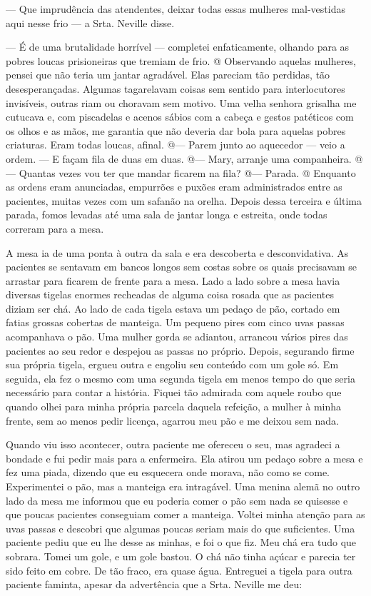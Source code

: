 --- Que imprudência das atendentes, deixar todas essas mulheres
mal-vestidas aqui nesse frio --- a Srta. Neville disse.

--- É de uma brutalidade horrível --- completei enfaticamente, olhando
para as pobres loucas prisioneiras que tremiam de frio. @ Observando
aquelas mulheres, pensei que não teria um jantar agradável. Elas
pareciam tão perdidas, tão desesperançadas. Algumas tagarelavam coisas
sem sentido para interlocutores invisíveis, outras riam ou choravam sem
motivo. Uma velha senhora grisalha me cutucava e, com piscadelas e
acenos sábios com a cabeça e gestos patéticos com os olhos e as mãos, me
garantia que não deveria dar bola para aquelas pobres criaturas. Eram
todas loucas, afinal. @--- Parem junto ao aquecedor --- veio a ordem.
--- E façam fila de duas em duas. @--- Mary, arranje uma companheira.
@--- Quantas vezes vou ter que mandar ficarem na fila? @--- Parada. @
Enquanto as ordens eram anunciadas, empurrões e puxões eram
administrados entre as pacientes, muitas vezes com um safanão na orelha.
Depois dessa terceira e última parada, fomos levadas até uma sala de
jantar longa e estreita, onde todas correram para a mesa.

A mesa ia de uma ponta à outra da sala e era descoberta e
desconvidativa. As pacientes se sentavam em bancos longos sem costas
sobre os quais precisavam se arrastar para ficarem de frente para a
mesa. Lado a lado sobre a mesa havia diversas tigelas enormes recheadas
de alguma coisa rosada que as pacientes diziam ser chá. Ao lado de cada
tigela estava um pedaço de pão, cortado em fatias grossas cobertas de
manteiga. Um pequeno pires com cinco uvas passas acompanhava o pão. Uma
mulher gorda se adiantou, arrancou vários pires das pacientes ao seu
redor e despejou as passas no próprio. Depois, segurando firme sua
própria tigela, ergueu outra e engoliu seu conteúdo com um gole só. Em
seguida, ela fez o mesmo com uma segunda tigela em menos tempo do que
seria necessário para contar a história. Fiquei tão admirada com aquele
roubo que quando olhei para minha própria parcela daquela refeição, a
mulher à minha frente, sem ao menos pedir licença, agarrou meu pão e me
deixou sem nada.

Quando viu isso acontecer, outra paciente me ofereceu o seu, mas
agradeci a bondade e fui pedir mais para a enfermeira. Ela atirou um
pedaço sobre a mesa e fez uma piada, dizendo que eu esquecera onde
morava, não como se come. Experimentei o pão, mas a manteiga era
intragável. Uma menina alemã no outro lado da mesa me informou que eu
poderia comer o pão sem nada se quisesse e que poucas pacientes
conseguiam comer a manteiga. Voltei minha atenção para as uvas passas e
descobri que algumas poucas seriam mais do que suficientes. Uma paciente
pediu que eu lhe desse as minhas, e foi o que fiz. Meu chá era tudo que
sobrara. Tomei um gole, e um gole bastou. O chá não tinha açúcar e
parecia ter sido feito em cobre. De tão fraco, era quase água. Entreguei
a tigela para outra paciente faminta, apesar da advertência que a Srta.
Neville me deu:

